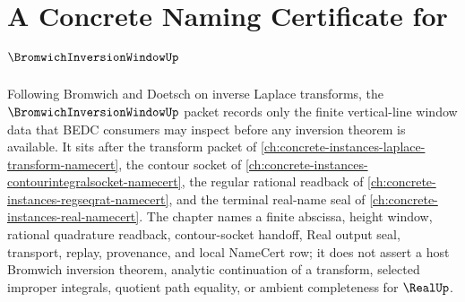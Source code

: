 \chapter{A Concrete Naming Certificate for $\BromwichInversionWindowUp$}
\label{ch:concrete-instances-bromwich-inversion-window-namecert}

Following Bromwich and Doetsch on inverse Laplace transforms, the $\BromwichInversionWindowUp$ packet records only the finite vertical-line window data that BEDC consumers may inspect before any inversion theorem is available. It sits after the transform packet of \autoref{ch:concrete-instances-laplace-transform-namecert}, the contour socket of \autoref{ch:concrete-instances-contourintegralsocket-namecert}, the regular rational readback of \autoref{ch:concrete-instances-regseqrat-namecert}, and the terminal real-name seal of \autoref{ch:concrete-instances-real-namecert}. The chapter names a finite abscissa, height window, rational quadrature readback, contour-socket handoff, Real output seal, transport, replay, provenance, and local NameCert row; it does not assert a host Bromwich inversion theorem, analytic continuation of a transform, selected improper integrals, quotient path equality, or ambient completeness for $\RealUp$.

